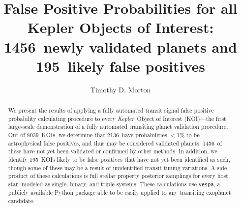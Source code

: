 \documentclass{emulateapj}
\newcommand{\ncalc}{8039}
\newcommand{\nval}{2136}
\newcommand{\nvalnew}{1456}
\newcommand{\nfpnew}{195}
\newcommand{\kepler}{\textit{Kepler}}
\newcommand{\vespa}{\texttt{vespa}}
\begin{document}

\title{False Positive Probabilities for all Kepler Objects of Interest: \\
        \nvalnew\ newly validated planets and \nfpnew\ likely false positives}


\author{Timothy D. Morton}



\begin{abstract}
We present the results of applying a fully automated transit signal
false positive probability calculating procedure to every
\kepler\ Object of Interest (KOI)---the first large-scale
demonstration of a fully automated transiting planet validation
procedure.  Out of \ncalc\ KOIs, we determine that \nval\ have
probabilities $<$1\% to be astrophysical false positives, and thus may
be considered validated planets.  \nvalnew\ of these have not yet been
validated or confirmed by other methods.  In addition, we identify
\nfpnew\ KOIs likely to be false positives that have not yet been
identified as such, though some of these may be a result of
unidentified transit timing variations. A side product of these
calculations is full stellar property posterior samplings for every
host star, modeled as single, binary, and triple systems.  These
calculations use \vespa, a publicly available Python package able to
be easily applied to any transiting exoplanet candidate.
\end{abstract}

\end{document}
